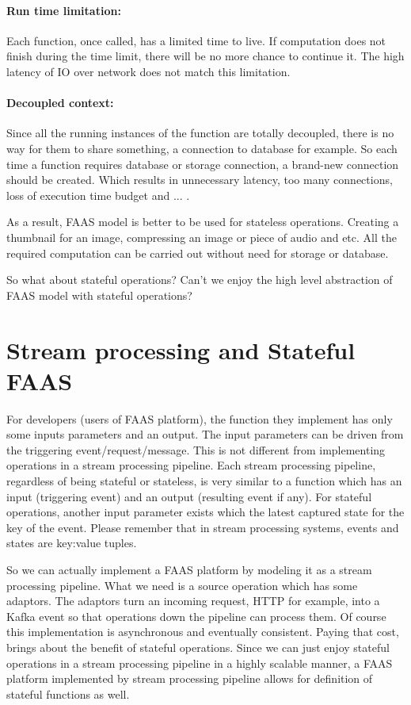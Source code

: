 \documentclass[a4]{report}
\begin{document}
        \paragraph{Run time limitation:} Each function, once called, has a limited time to live.
        If computation does not finish during the time limit, there will be no more chance to continue it.
        The high latency of IO over network does not match this limitation.

        \paragraph{Decoupled context:} Since all the running instances of the function are totally decoupled, there is
        no way for them to share something, a connection to database for example.
        So each time a function requires database or storage connection, a brand-new connection should be created.
        Which results in unnecessary latency, too many connections, loss of execution time budget and ... .

        As a result, FAAS model is better to be used for stateless operations.
        Creating a thumbnail for an image, compressing an image or piece of audio and etc.
        All the required computation can be carried out without need for storage or database.

        So what about stateful operations?
        Can't we enjoy the high level abstraction of FAAS model with stateful operations?

        \section{Stream processing and Stateful FAAS}
        For developers (users of FAAS platform), the function they implement has only some inputs parameters and an output.
        The input parameters can be driven from the triggering event/request/message.
        This is not different from implementing operations in a stream processing pipeline.
        Each stream processing pipeline, regardless of being stateful or stateless, is very similar to a function which
        has an input (triggering event) and an output (resulting event if any).
        For stateful operations, another input parameter exists which the latest captured state for the key of the event.
        Please remember that in stream processing systems, events and states are key:value tuples.

        So we can actually implement a FAAS platform by modeling it as a stream processing pipeline.
        What we need is a source operation which has some adaptors.
        The adaptors turn an incoming request, HTTP for example, into a Kafka event so that operations down the pipeline
        can process them.
        Of course this implementation is asynchronous and eventually consistent.
        Paying that cost, brings about the benefit of stateful operations.
        Since we can just enjoy stateful operations in a stream processing pipeline in a highly scalable manner,
        a FAAS platform implemented by stream processing pipeline allows for definition of stateful functions as well.
\end{document}
